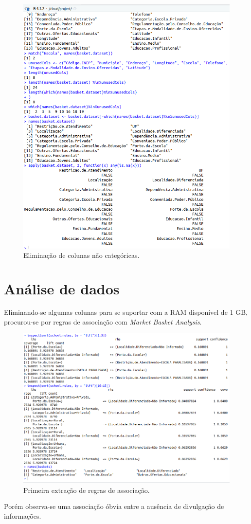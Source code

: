 \documentclass{article}[twocolumn]
\begin{document}
	\begin{figure}[H]
		\centering
		\includegraphics[width=\textwidth]{figures/manipulation2.png}
		\caption{Elimina\c{c}\~ao de colunas n\~ao categ\'oricas.}
	\end{figure}
	\section{An\'alise de dados}
	Eliminando-se algumas colunas para se suportar com a RAM dispon\'ivel de 1 GB,
	procurou-se por regras de associa\c{c}\~ao com \textit{Market Basket Analysis}.
	\begin{figure}[H]
		\centering
		\includegraphics[width=\textwidth]{figures/extraction1.png}
		\caption{Primeira extra\c{c}\~ao de regras de associa\c{c}\~ao.}
	\end{figure}
	Por\'em observa-se uma associa\c{c}\~ao \'obvia entre a aus\^encia de divulga\c{c}\~ao de
	informa\c{c}\~oes.
\end{document}
